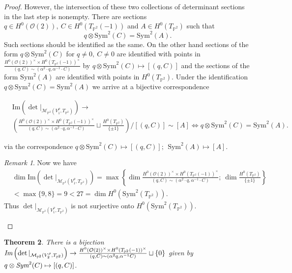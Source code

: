 \documentclass[12pt]{amsart}
\newtheorem{theorem}{Theorem}[subsection]
\theoremstyle{definition}
\theoremstyle{remark}
\newtheorem{remark}[theorem]{Remark}
\numberwithin{equation}{section}
\begin{document}
\begin{proof}
However, the intersection of these two collections of determinant sections in the last step is nonempty. There are sections $q\in H^0(\mathcal{O}(2)),~ C\in H^0(T_{\mathbb{P}^2}(-1))$ and $A\in H^0(T_{\mathbb{P}^2})$ such that $$q\otimes\mbox{Sym}^2(C) = \mbox{Sym}^2(A).$$ Such sections should be identified as the same. On the other hand sections of the form $q\otimes\mbox{Sym}^2(C)$ for $q\neq 0,~ C\neq 0$ are identified with points in $\frac{H^0(\mathcal{O}(2))^\times\times H^0(T_{\mathbb{P}^2}(-1))^\times}{(q, C)\sim (\alpha^2\cdot q, \alpha^{-1}\cdot C)}$ by $q\otimes\mbox{Sym}^2(C)\mapsto [(q, C)]$ and the sections of the form $\mbox{Sym}^2(A)$ are identified with points in $H^0(T_{\mathbb{P}^2})$. Under the identification $q\otimes\mbox{Sym}^2(C) = \mbox{Sym}^2(A)$ we arrive at a bijective correspondence 

\begin{align*}
&\mbox{Im}\left(\det|_{\mathcal{M}_{\mathbb{P}^2}(V_1^\rho, T_{\mathbb{P}^2})}\right)\to\\
&\left(\frac{H^0(\mathcal{O}(2))^\times\times H^0(T_{\mathbb{P}^2}(-1))^\times}{(q, C)\sim (\alpha^2\cdot q, \alpha^{-1}\cdot C)}\sqcup\frac{H^0(T_{\mathbb{P}^2})}{\{\pm 1\}}\right)\bigg/[(q, C)]\sim [A]\iff q\otimes\mbox{Sym}^2(C) = \mbox{Sym}^2(A).
\end{align*}

via the correspondence $q\otimes\mbox{Sym}^2(C)\mapsto [(q, C)];~~\mbox{Sym}^2(A)\mapsto [A]$.
\begin{remark}
Now we have
\begin{align*}
&\dim \mbox{Im}\left(\det|_{\mathcal{M}_{\mathbb{P}^2}(V_1^\rho, T_{\mathbb{P}^2})}\right) = \max \left\{\dim \frac{H^0(\mathcal{O}(2))^\times\times H^0(T_{\mathbb{P}^2}(-1))^\times}{(q, C)\sim (\alpha^2\cdot q, \alpha^{-1}\cdot C)};~\dim \frac{H^0(T_{\mathbb{P}^2})}{\{\pm 1\}}\right\}\\
& < \max\{9, 8\} = 9 < 27 = \dim H^0(\mbox{Sym}^2(T_{\mathbb{P}^2})).
\end{align*} Thus $\det|_{\mathcal{M}_{\mathbb{P}^2}(V_1^\rho, T_{\mathbb{P}^2})}$ is not surjective onto $H^0(\mbox{Sym}^2(T_{\mathbb{P}^2}))$.
\end{remark}



\end{proof}

\begin{theorem}\label{det3}
There is a bijection $\emph{Im}\left(\det|_{\mathcal{M}_{\mathbb{P}^2}(V_2^\rho, T_{\mathbb{P}^2})}\right)\to\frac{H^0(\mathcal{O}(2))^\times\times H^0(T_{\mathbb{P}^2}(-1))^\times}{(q, C)\sim (\alpha^2q, \alpha^{-1}C)}\sqcup\{0\}$ given by $q\otimes\emph{Sym}^2(C)\mapsto [(q, C)]$.
\end{theorem}
\end{document}
